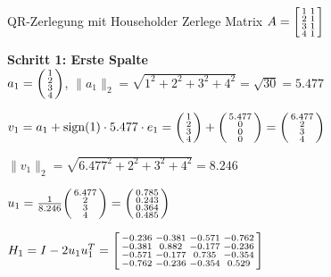\begin{example2}{QR-Zerlegung mit Householder}
Zerlege Matrix $A = \begin{bsmallmatrix} 1 & 1 \\ 2 & 1 \\ 3 & 1 \\ 4 & 1 \end{bsmallmatrix}$

\textbf{Schritt 1: Erste Spalte}\\
$a_1 = \begin{psmallmatrix} 1 \\ 2 \\ 3 \\ 4 \end{psmallmatrix}$, $\|a_1\|_2 = \sqrt{1^2+2^2+3^2+4^2} = \sqrt{30} = 5.477$

$v_1 = a_1 + \text{sign}(1) \cdot 5.477 \cdot e_1 = \begin{psmallmatrix} 1 \\ 2 \\ 3 \\ 4 \end{psmallmatrix} + \begin{psmallmatrix} 5.477 \\ 0 \\ 0 \\ 0 \end{psmallmatrix} = \begin{psmallmatrix} 6.477 \\ 2 \\ 3 \\ 4 \end{psmallmatrix}$

$\|v_1\|_2 = \sqrt{6.477^2+2^2+3^2+4^2} = 8.246$

$u_1 = \frac{1}{8.246}\begin{psmallmatrix} 6.477 \\ 2 \\ 3 \\ 4 \end{psmallmatrix} = \begin{psmallmatrix} 0.785 \\ 0.243 \\ 0.364 \\ 0.485 \end{psmallmatrix}$

$H_1 = I - 2u_1 u_1^T = \begin{bsmallmatrix} -0.236 & -0.381 & -0.571 & -0.762 \\ -0.381 & 0.882 & -0.177 & -0.236 \\ -0.571 & -0.177 & 0.735 & -0.354 \\ -0.762 & -0.236 & -0.354 & 0.529 \end{bsmallmatrix}$


\end{example2}
